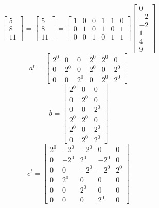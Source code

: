 \documentclass{article}%
\begin{document}
\[%
\left[\begin{matrix}5\\8\\11\end{matrix}\right] = \left[\begin{matrix}5\\8\\11\end{matrix}\right] = \left[\begin{matrix}1 & 0 & 0 & 1 & 1 & 0\\0 & 1 & 0 & 1 & 0 & 1\\0 & 0 & 1 & 0 & 1 & 1\end{matrix}\right] \left[\begin{matrix}0\\-2\\-2\\1\\4\\9\end{matrix}\right]%
\]%
\[%
a^{t} = \left[\begin{matrix}2^{0} & 0 & 0 & 2^{0} & 2^{0} & 0\\0 & 2^{0} & 0 & 2^{0} & 0 & 2^{0}\\0 & 0 & 2^{0} & 0 & 2^{0} & 2^{0}\end{matrix}\right]%
\]%
\[%
b = \left[\begin{matrix}2^{0} & 0 & 0\\0 & 2^{0} & 0\\0 & 0 & 2^{0}\\2^{0} & 2^{0} & 0\\2^{0} & 0 & 2^{0}\\0 & 2^{0} & 2^{0}\end{matrix}\right]%
\]%
\[%
c^{t} = \left[\begin{matrix}2^{0} & - 2^{0} & - 2^{0} & 0 & 0\\0 & - 2^{0} & 2^{0} & - 2^{0} & 0\\0 & 0 & - 2^{0} & - 2^{0} & 2^{0}\\0 & 2^{0} & 0 & 0 & 0\\0 & 0 & 2^{0} & 0 & 0\\0 & 0 & 0 & 2^{0} & 0\end{matrix}\right]%
\]%
\end{document}
